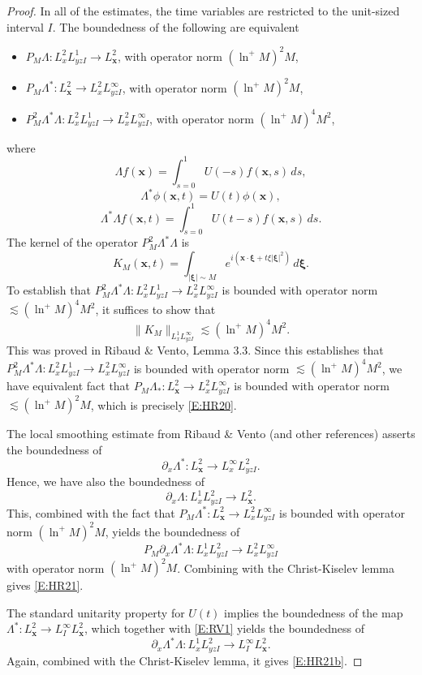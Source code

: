 \documentclass[12pt,letterpaper]{amsart}
\theoremstyle{remark}
\numberwithin{equation}{section}
\numberwithin{theorem}{section}
\numberwithin{table}{section}
\begin{document}
\begin{proof}
In all of the estimates, the time variables are restricted to the unit-sized interval $I$. The boundedness of the following are equivalent
\begin{itemize}
\item 
$P_M \Lambda:  L_x^2L_{yzI}^1 \to  L_{\mathbf{x}}^2 $, with operator norm $(\ln^+ M)^2M$,
\item 
$P_M \Lambda^*:  L_{\mathbf{x}}^2 \to L_x^2 L_{yzI}^\infty $,  with operator norm $(\ln^+ M)^2M$,
\item 
$P_M^2 \Lambda^* \Lambda: L_x^2L_{yzI}^1 \to L_x^2 L_{yzI}^\infty$,  with operator norm $(\ln^+ M)^4M^2$,
\end{itemize}
where
$$\Lambda f(\mathbf{x}) = \int_{s=0}^1 U(-s) f(\mathbf{x}, s) \, ds,$$
$$\Lambda^* \phi(\mathbf{x},t) = U(t) \phi(\mathbf{x}),$$
$$\Lambda^*\Lambda f(\mathbf{x},t) = \int_{s=0}^1 U(t-s) f(\mathbf{x},s) \, ds.$$
The kernel of the operator $P_M^2 \Lambda^*\Lambda$ is
$$
K_M(\mathbf{x},t) = \int_{|\boldsymbol{\xi}|\sim M} e^{i(\mathbf{x}\cdot \boldsymbol{\xi} + t\xi|\boldsymbol{\xi}|^2)} \, d\boldsymbol{\xi}. 
$$
To establish that $P_M^2 \Lambda^*\Lambda: L_x^2L_{yzI}^1 \to L_x^2 L_{yzI}^\infty$ is bounded with operator norm $\lesssim (\ln^+ M)^4M^2$, it suffices to show that
$$
\|K_M \|_{L_x^1L_{yzI}^\infty} \lesssim (\ln^+ M)^4M^2.
$$
This was proved in Ribaud \& Vento, Lemma 3.3.  Since this establishes that  $P_M^2 \Lambda^*\Lambda: L_x^2L_{yzI}^1 \to L_x^2 L_{yzI}^\infty$ is bounded with operator norm $\lesssim (\ln^+ M)^4M^2$, we have equivalent fact that $P_M \Lambda_*: L_{\mathbf{x}}^2 \to L_x^2 L_{yz I}^\infty$ is  bounded with operator norm $\lesssim (\ln^+ M)^2M$, which is precisely \eqref{E:HR20}.

The local smoothing estimate from Ribaud \& Vento (and other references) asserts  the boundedness of 
$$
\partial_x \Lambda^*:  L_{\mathbf{x}}^2 \to L_x^\infty L_{yz I}^2.
$$ 
Hence, we have also the boundedness of
\begin{equation}
\label{E:RV1}
\partial_x \Lambda:  L_x^1 L_{yz I}^2 \to  L_{\mathbf{x}}^2.
\end{equation}
This, combined with the fact that $P_M \Lambda^*:  L_{\mathbf{x}}^2 \to L_x^2 L_{yzI}^\infty $  is bounded with operator norm $(\ln^+ M)^2M$, yields the boundedness of 
$$
P_M \partial_x \Lambda^* \Lambda:  L_x^1 L_{yz I}^2 \to   L_x^2 L_{yzI}^\infty
$$
with operator norm $(\ln^+ M)^2M$.  Combining with the Christ-Kiselev lemma gives \eqref{E:HR21}. 

The standard unitarity property for $U(t)$ implies the boundedness of the map $\Lambda^*: L_{\mathbf{x}}^2 \to L_I^\infty L_{\mathbf{x}}^2$, which together with \eqref{E:RV1} yields the boundedness of
$$
\partial_x \Lambda^* \Lambda : L_x^1 L_{yz I}^2 \to L_I^\infty L_{\mathbf{x}}^2.
$$
Again, combined with the Christ-Kiselev lemma, it gives \eqref{E:HR21b}. 
\end{proof}
\end{document}
